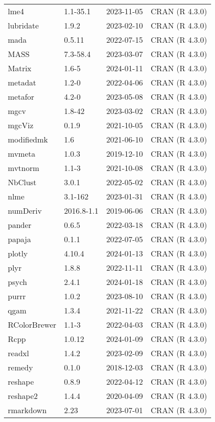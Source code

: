 \documentclass[
]{article}
\begin{document}
\begin{table}
\begin{tabular}[t]{llll}
\addlinespace
lme4 & 1.1-35.1 & 2023-11-05 & CRAN (R 4.3.0)\\
lubridate & 1.9.2 & 2023-02-10 & CRAN (R 4.3.0)\\
mada & 0.5.11 & 2022-07-15 & CRAN (R 4.3.0)\\
MASS & 7.3-58.4 & 2023-03-07 & CRAN (R 4.3.0)\\
Matrix & 1.6-5 & 2024-01-11 & CRAN (R 4.3.0)\\
\addlinespace
metadat & 1.2-0 & 2022-04-06 & CRAN (R 4.3.0)\\
metafor & 4.2-0 & 2023-05-08 & CRAN (R 4.3.0)\\
mgcv & 1.8-42 & 2023-03-02 & CRAN (R 4.3.0)\\
mgcViz & 0.1.9 & 2021-10-05 & CRAN (R 4.3.0)\\
modifiedmk & 1.6 & 2021-06-10 & CRAN (R 4.3.0)\\
\addlinespace
mvmeta & 1.0.3 & 2019-12-10 & CRAN (R 4.3.0)\\
mvtnorm & 1.1-3 & 2021-10-08 & CRAN (R 4.3.0)\\
NbClust & 3.0.1 & 2022-05-02 & CRAN (R 4.3.0)\\
nlme & 3.1-162 & 2023-01-31 & CRAN (R 4.3.0)\\
numDeriv & 2016.8-1.1 & 2019-06-06 & CRAN (R 4.3.0)\\
\addlinespace
pander & 0.6.5 & 2022-03-18 & CRAN (R 4.3.0)\\
papaja & 0.1.1 & 2022-07-05 & CRAN (R 4.3.0)\\
plotly & 4.10.4 & 2024-01-13 & CRAN (R 4.3.0)\\
plyr & 1.8.8 & 2022-11-11 & CRAN (R 4.3.0)\\
psych & 2.4.1 & 2024-01-18 & CRAN (R 4.3.0)\\
\addlinespace
purrr & 1.0.2 & 2023-08-10 & CRAN (R 4.3.0)\\
qgam & 1.3.4 & 2021-11-22 & CRAN (R 4.3.0)\\
RColorBrewer & 1.1-3 & 2022-04-03 & CRAN (R 4.3.0)\\
Rcpp & 1.0.12 & 2024-01-09 & CRAN (R 4.3.0)\\
readxl & 1.4.2 & 2023-02-09 & CRAN (R 4.3.0)\\
\addlinespace
remedy & 0.1.0 & 2018-12-03 & CRAN (R 4.3.0)\\
reshape & 0.8.9 & 2022-04-12 & CRAN (R 4.3.0)\\
reshape2 & 1.4.4 & 2020-04-09 & CRAN (R 4.3.0)\\
rmarkdown & 2.23 & 2023-07-01 & CRAN (R 4.3.0)\\

\end{tabular}
\end{table}
\end{document}
